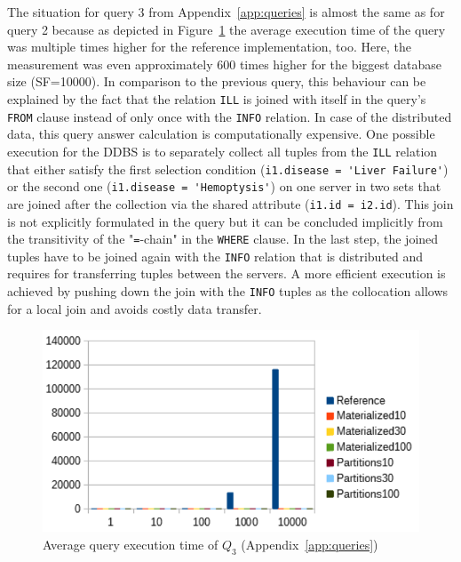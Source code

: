 The situation for query 3 from Appendix~\ref{app:queries} is almost the same as for query 2 because as depicted in Figure~\ref{fig:query3} the average execution
time of the query was multiple times higher for the reference implementation, too. Here, the measurement was even approximately 600 times higher for the biggest
database size (SF=10000). In comparison to the previous query, this behaviour can be explained by the fact that the relation \verb!ILL! is joined with itself in
the query's \verb!FROM! clause instead of only once with the \verb!INFO! relation. In case of the distributed data, this query answer calculation is 
computationally expensive. One possible execution for the DDBS is to separately collect all tuples from the \verb!ILL! relation that either satisfy the first 
selection condition (\verb!i1.disease = 'Liver Failure'!) or the second one (\verb!i1.disease = 'Hemoptysis'!) on one server in two sets that are joined after 
the collection via the shared attribute (\verb!i1.id = i2.id!). This join is not explicitly formulated in the query but it can be concluded implicitly from the 
transitivity of the "\verb!=!-chain" in the \verb!WHERE! clause. In the last step, the joined tuples have to be joined again with the \verb!INFO! relation that 
is distributed and requires for transferring tuples between the servers. A more efficient execution is achieved by pushing down the join with the \verb!INFO!
tuples as the collocation allows for a local join and avoids costly data transfer.
\begin{figure}[h]
    \centering
    \includegraphics[scale=0.9]{charts/Query3.pdf}
    \caption{Average query execution time of $Q_3$ (Appendix~\ref{app:queries})}
    \label{fig:query3}
\end{figure}


